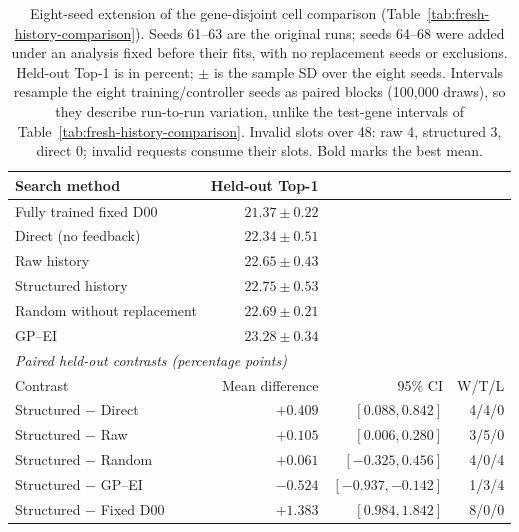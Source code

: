 \begin{table}[htbp]
\caption{Eight-seed extension of the gene-disjoint cell comparison (Table~\ref{tab:fresh-history-comparison}). Seeds 61--63 are the original runs; seeds 64--68 were added under an analysis fixed before their fits, with no replacement seeds or exclusions. Held-out Top-1 is in percent; $\pm$ is the sample SD over the eight seeds. Intervals resample the eight training/controller seeds as paired blocks (100,000 draws), so they describe run-to-run variation, unlike the test-gene intervals of Table~\ref{tab:fresh-history-comparison}. Invalid slots over 48: raw 4, structured 3, direct 0; invalid requests consume their slots. Bold marks the best mean.}
\label{tab:fresh-history-eight-seed}
\centering\small
\setlength{\tabcolsep}{3pt}
\begin{tabularx}{\linewidth}{@{}Xrrr@{}}
\toprule
Search method & Held-out Top-1 & & \\
\midrule
Fully trained fixed D00 & $21.37 \pm 0.22$ & & \\
Direct (no feedback) & $22.34 \pm 0.51$ & & \\
Raw history & $22.65 \pm 0.43$ & & \\
Structured history & $22.75 \pm 0.53$ & & \\
Random without replacement & $22.69 \pm 0.21$ & & \\
GP--EI & $\mathbf{23.28 \pm 0.34}$ & & \\
\midrule
\multicolumn{4}{l}{\textit{Paired held-out contrasts (percentage points)}} \\
Contrast & Mean difference & 95\% CI & W/T/L \\
Structured $-$ Direct & $+0.409$ & $[0.088, 0.842]$ & 4/4/0 \\
Structured $-$ Raw & $+0.105$ & $[0.006, 0.280]$ & 3/5/0 \\
Structured $-$ Random & $+0.061$ & $[-0.325, 0.456]$ & 4/0/4 \\
Structured $-$ GP--EI & $-0.524$ & $[-0.937, -0.142]$ & 1/3/4 \\
Structured $-$ Fixed D00 & $+1.383$ & $[0.984, 1.842]$ & 8/0/0 \\
\bottomrule
\end{tabularx}
\end{table}
